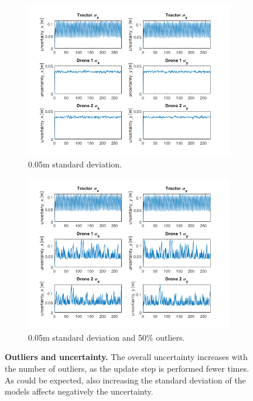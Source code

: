 \documentclass[letterpaper,twocolumn,10pt]{article}
\begin{document}
\begin{figure}[!h]
    \begin{subfigure}[b]{0.40\textwidth}
         \centering
         \includegraphics[width=\textwidth]{images/3.png}
         \caption{0.05m standard deviation.}
         \label{fig:8c}
     \end{subfigure}
     \hfill
     \begin{subfigure}[b]{0.40\textwidth}
         \centering
         \includegraphics[width=\textwidth]{images/4.png}
         \caption{0.05m standard deviation and 50\% outliers.}
         \label{fig:8d}
     \end{subfigure}
     
     \caption{\textbf{Outliers and uncertainty.} The overall uncertainty increases with the number of outliers, as the update step is performed fewer times. As could be expected, also increasing the standard deviation of the models affects negatively the uncertainty. }
     \label{fig:8}
\end{figure}
\end{document}

